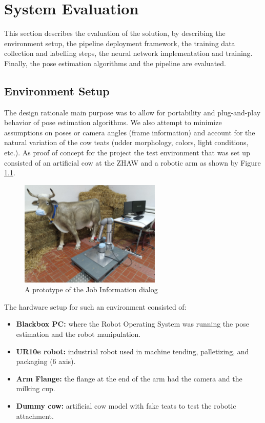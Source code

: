 
\chapter{System Evaluation}\label{chap:evaluation}
This section describes the evaluation of the solution, by describing the environment setup, the pipeline deployment framework, the training data collection and labelling steps, the neural network implementation and training. Finally, the pose estimation algorithms and the pipeline are evaluated.

\section{Environment Setup}
    The design rationale main purpose was to allow for portability and plug-and-play behavior of pose estimation algorithms. We also attempt to minimize assumptions on poses or camera angles (frame information) and account for the natural variation of the cow teats (udder morphology, colors, light conditions, etc.). As proof of concept for the project the test environment that was set up consisted of an artificial cow at the ZHAW and a robotic arm as shown by Figure \ref{fig:cow_setup}.
    
    \begin{figure}[h]
        \centering
        \includegraphics[width=0.6\textwidth]{images/cow_setup.png}
        \caption{A prototype of the Job Information dialog}
        \label{fig:cow_setup}
    \end{figure}
    The hardware setup for such an environment consisted of:
    \begin{itemize}
        \item \textbf{Blackbox PC:} where the Robot Operating System was running the pose estimation and the robot manipulation.
        \item \textbf{UR10e robot:} industrial robot used in machine tending, palletizing, and packaging (6 axis).
        \item \textbf{Arm Flange:} the flange at the end of the arm had the camera and the milking cup.
        \item \textbf{Dummy cow:} artificial cow model with fake teats to test the robotic attachment.
    \end{itemize}
   
